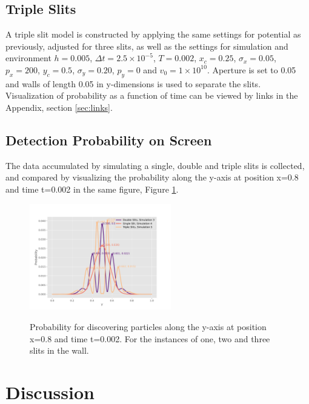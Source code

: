 \documentclass[10pt, nofootinbib, twocolumn]{revtex4-1}
\begin{document}
\subsection{Triple Slits}
A triple slit model is constructed by applying the same settings for potential as previously, adjusted for three slits, as well as the settings for simulation and environment $h = 0.005$, $\Delta t = 2.5\times10^{-5}$, $T = 0.002$, $x_c = 0.25$, $\sigma_x = 0.05$, $p_x = 200$, $y_c = 0.5$, $\sigma_y = 0.20$, $p_y = 0$ and $v_0 = 1\times10^{10}$. Aperture is set to 0.05 and walls of length 0.05 in y-dimensions is used to separate the slits. Visualization of probability as a function of time can be viewed by links in the Appendix, section \ref{sec:links}.



\subsection{Detection Probability on Screen}
The data accumulated by simulating a single, double and triple slits is collected, and compared by visualizing the probability along the y-axis at position x=0.8 and time t=0.002 in the same figure, Figure \ref{fig:comparison}. 

\begin{figure}[H]
    \caption{Probability for discovering particles along the y-axis at position x=0.8 and time t=0.002. For the instances of one, two and three slits in the wall.}
    \centering
    \includegraphics[width = 0.55\textwidth]{figures/wall.pdf} 
    \label{fig:comparison}
\end{figure} 



\section{Discussion}\label{sec:discussion}
\end{document}
